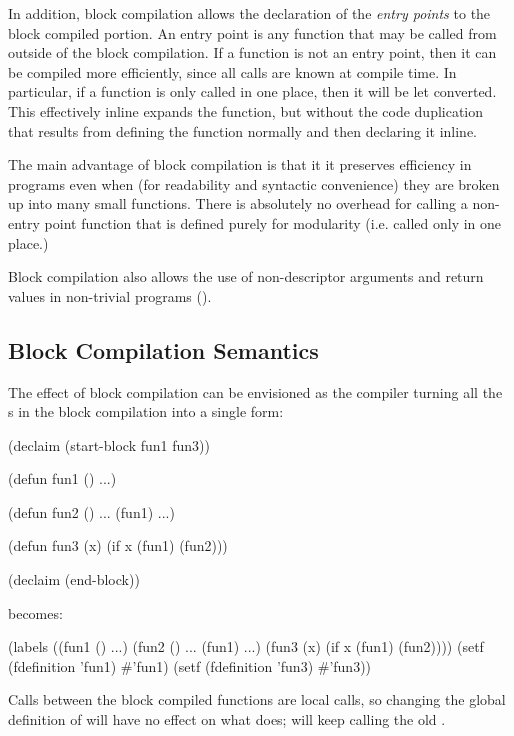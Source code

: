 In addition, block compilation allows the declaration of the \textit{entry points}
to the block compiled portion.  An entry point is any function that may be
called from outside of the block compilation.  If a function is not an entry
point, then it can be compiled more efficiently, since all calls are known at
compile time.  In particular, if a function is only called in one place, then
it will be let converted.  This effectively inline expands the function, but
without the code duplication that results from defining the function normally
and then declaring it inline.

The main advantage of block compilation is that it it preserves efficiency in
programs even when (for readability and syntactic convenience) they are broken
up into many small functions.  There is absolutely no overhead for calling a
non-entry point function that is defined purely for modularity (i.e. called
only in one place.)

Block compilation also allows the use of non-descriptor arguments and return
values in non-trivial programs ().


\subsection{Block Compilation Semantics}

The effect of block compilation can be envisioned as the compiler turning all
the s in the block compilation into a single  form:
\begin{example}
(declaim (start-block fun1 fun3))

(defun fun1 ()
  ...)

(defun fun2 ()
  ...
  (fun1)
  ...)

(defun fun3 (x)
  (if x
      (fun1)
      (fun2)))

(declaim (end-block))
\end{example}
becomes:
\begin{example}
(labels ((fun1 ()
           ...)
         (fun2 ()
           ...
           (fun1)
           ...)
         (fun3 (x)
           (if x
               (fun1)
               (fun2))))
  (setf (fdefinition 'fun1) #'fun1)
  (setf (fdefinition 'fun3) #'fun3))
\end{example}
Calls between the block compiled functions are local calls, so changing the
global definition of  will have no effect on what  does;
 will keep calling the old .

